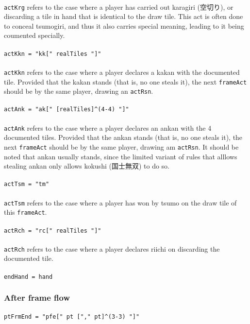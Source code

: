 \documentclass[%
	a4paper%
	,10pt%
	,twoside%
	,notitlepage%
]{article}%
\newcommand*{\ruleSymbol}{\textjapanese{⚠}}%
\newcommand*{\ruleMargin}{\marginpar{\flushright{}\ruleSymbol{}}}%
\newcommand*{\rulePar}{\paragraph*{\ruleMargin{}}}%
\begin{document}
			\paragraph*{}\lstinline/actKrg/ refers to the case where a player has carried out karagiri (\textjapanese{空切り}), or discarding a tile in hand that is identical to the draw tile. This act is often done to conceal tsumogiri, and thus it also carries special meaning, leading to it being coumented specially. %
			\rulePar{}\lstinline/actKkn = "kk[" realTiles "]"/%
			\paragraph*{}\lstinline/actKkn/ refers to the case where a player declares a kakan with the documented tile. Provided that the kakan stands (that is, no one steals it), the next \lstinline/frameAct/ should be by the same player, drawing an \lstinline/actRsn/. %
			\rulePar{}\lstinline/actAnk = "ak[" [realTiles]^(4-4) "]"/%
			\paragraph*{}\lstinline/actAnk/ refers to the case where a player declares an ankan with the 4 documented tiles. Provided that the ankan stands (that is, no one steals it), the next \lstinline/frameAct/ should be by the same player, drawing am \lstinline/actRsn/. It should be noted that ankan usually stands, since the limited variant of rules that alllows stealing ankan only allows kokushi (\textjapanese{国士無双}) to do so. %
			\rulePar{}\lstinline/actTsm = "tm"/%
			\paragraph*{}\lstinline/actTsm/ refers to the case where a player has won by tsumo on the draw tile of this \lstinline/frameAct/. %
			\rulePar{}\lstinline/actRch = "rc[" realTiles "]"/%
			\paragraph*{}\lstinline/actRch/ refers to the case where a player declares riichi on discarding the documented tile. %
			\rulePar{}\lstinline/endHand = hand/%
		\subsubsection{After frame flow}\label{subsubsec:postfrmflow}%
			\rulePar{}\lstinline/ptFrmEnd = "pfe[" pt ["," pt]^(3-3) "]"/%
\end{document}
